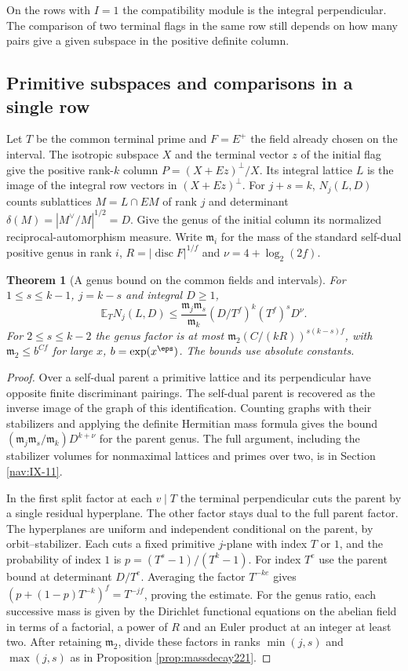 \documentclass[a4paper,11pt]{article}
\newtheorem{theorem}[proposition]{Theorem}
\theoremstyle{definition}
\theoremstyle{remark}
\numberwithin{equation}{section}
\begin{document}
On the rows with \(I=1\) the compatibility module is the
integral perpendicular. The comparison of two terminal flags
in the same row still depends on how many pairs give a given
subspace in the positive definite column.

\subsection{Primitive subspaces and comparisons in a single row}\label{nav:IX-26}
Let \(T\) be the common terminal prime and \(F=E^+\) the
field already chosen on the interval. The isotropic subspace
\(X\) and the terminal vector \(z\) of the initial flag give
the positive rank-\(k\) column \(P=(X+Ez)^\perp/X\).
Its integral lattice \(L\) is the image of the integral row
vectors in \((X+Ez)^\perp\). For \(j+s=k\),
\(N_j(L,D)\) counts sublattices \(M=L\cap EM\) of rank \(j\)
and determinant \(\delta(M)=|M^\vee/M|^{1/2}=D\).
Give the genus of the initial column its normalized
reciprocal-automorphism measure. Write \(\mathfrak m_i\) for
the mass of the standard self-dual positive genus in rank
\(i\), \(R=|\operatorname{disc}F|^{1/f}\) and
\(\nu=4+\log_2(2f)\).

\begin{theorem}[A genus bound on the common fields and intervals]
\label{thm:genus222}
For \(1\le s\le k-1\), \(j=k-s\) and integral \(D\ge1\),
\[
   \mathbb E_T N_j(L,D)\le
    \frac{\mathfrak m_j\mathfrak m_s}{\mathfrak m_k}
              (D/T^f)^k(T^f)^s D^\nu .
\]
For \(2\le s\le k-2\) the genus factor is at most
\(\mathfrak m_2(C/(kR))^{s(k-s)f}\), with
\(\mathfrak m_2\le b^{Cf}\) for large \(x\), \(b=\exp(x^\eps)\).
The bounds use absolute constants.
\end{theorem}
\begin{proof}
Over a self-dual parent a primitive lattice and its
perpendicular have opposite finite discriminant pairings.
The self-dual parent is recovered as the inverse image of the
graph of this identification. Counting graphs with their
stabilizers and applying the definite Hermitian mass formula
gives the bound
\((\mathfrak m_j\mathfrak m_s/\mathfrak m_k)D^{k+\nu}\)
for the parent genus. The full argument, including the
stabilizer volumes for nonmaximal lattices and primes over
two, is in
Section \ref{nav:IX-11}.

In the first split factor at each \(v\mid T\) the terminal
perpendicular cuts the parent by a single residual hyperplane.
The other factor stays dual to the full parent factor. The
hyperplanes are uniform and independent conditional on the
parent, by orbit--stabilizer. Each cuts a fixed primitive
\(j\)-plane with index \(T\) or \(1\), and the probability
of index \(1\) is \(p=(T^s-1)/(T^k-1)\). For index \(T^e\)
use the parent bound at determinant \(D/T^e\). Averaging
the factor \(T^{-ke}\) gives
\((p+(1-p)T^{-k})^f=T^{-jf}\), proving the estimate.
For the genus ratio, each successive mass is given by the
Dirichlet functional equations on the abelian field in terms
of a factorial, a power of \(R\) and an Euler product at an
integer at least two. After retaining \(\mathfrak m_2\),
divide these factors in ranks \(\min(j,s)\) and
\(\max(j,s)\) as in
Proposition \ref{prop:massdecay221}.
\end{proof}
\end{document}
